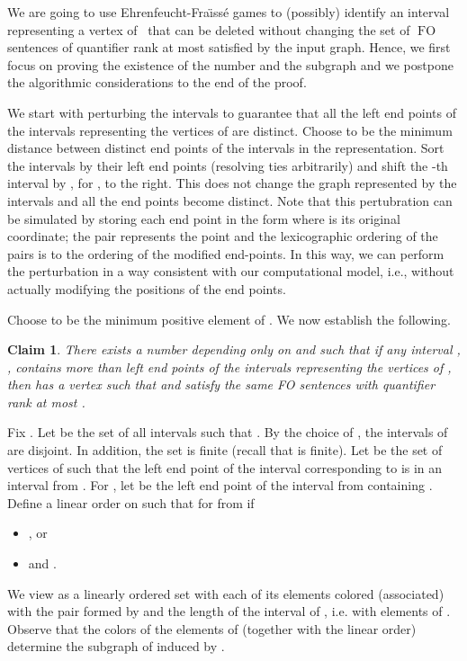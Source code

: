 \documentclass{CSML}
\newcommand{\FO}{\ensuremath{\operatorname{FO}}\xspace}
\theoremstyle{plain}\newtheorem{claim}[thm]{Claim}
\begin{document}
\proof
We are going to use Ehrenfeucht-Fra{\"\i}ss\'e games to (possibly) identify an interval
representing a vertex of~ that can be deleted without changing the set
of \FO sentences of quantifier rank at most  satisfied by the input graph.
Hence, we first focus on proving the existence of the number  and the subgraph  and
we postpone the algorithmic considerations to the end of the proof.

We start with perturbing the intervals to guarantee that all the left end points of the intervals representing the vertices of  are distinct.
Choose  to be the minimum distance between distinct end points of the intervals in the representation.
Sort the intervals by their left end points (resolving ties arbitrarily) and
shift the -th interval by , for , to the right.
This does not change the graph represented by the intervals and all the end points become distinct.
Note that this pertubration can be simulated by storing each end point in the form  where  is its original coordinate;
the pair  represents the point  and the lexicographic ordering of the pairs is to the ordering of the modified end-points.
In this way, we can perform the perturbation in a way consistent with our computational model,
i.e., without actually modifying the positions of the end points.

Choose  to be the minimum positive element of . We now establish the following.
\begin{claim}
There exists a number  depending only on  and  such that
if any interval , , contains more than  left end points of the intervals representing the vertices of ,
then  has a vertex  such that  and  satisfy the same FO sentences with quantifier rank at most .
\end{claim}
Fix . Let  be the set of all intervals  such that .
By the choice of , the intervals of  are disjoint.
In addition, the set  is finite (recall that  is finite).
Let  be the set of vertices  of  such that the left end point  of the interval corresponding to  is in an interval from .
For , let  be the left end point of the interval from  containing .
Define a linear order on  such that  for  from  if
\begin{itemize}
\item , or
\item  and .
\end{itemize}
We view  as a linearly ordered set with each of its elements colored (associated) with the pair formed by  and the length of the interval of ,
i.e. with elements of .
Observe that the colors of the elements of  (together with the linear order) determine the subgraph of  induced by .
\end{document}
